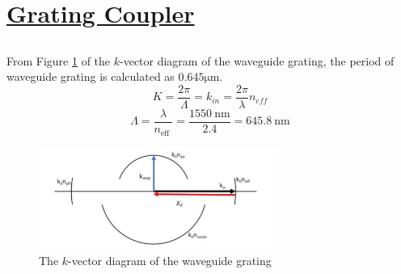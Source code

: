 \documentclass[fontsize=11pt]{scrartcl}
\begin{document}
\pagebreak
\section{\uline{Grating Coupler}}
\subsection{}
From Figure \ref{fig3.1} of the $k$-vector diagram of the waveguide grating, 
the period of waveguide grating is calculated as $0.645\mathrm{\mu m}$.
\begin{equation}
    K=\frac{2 \pi}{\Lambda}=k_{i n}=\frac{2 \pi}{\lambda} n_{e f f}
\end{equation}
\begin{equation}
    \Lambda=\frac{\lambda}{n_{\text {eff }}}=\frac{1550 \mathrm{~nm}}{2.4}=645.8 \mathrm{~nm}
\end{equation}  
\begin{figure}[H]
    \centering
     \includegraphics[width=0.7\textwidth]{img/fig3.1.jpg}
     \caption{The $k$-vector diagram of the waveguide grating}
     \label{fig3.1}
\end{figure}
\end{document}
